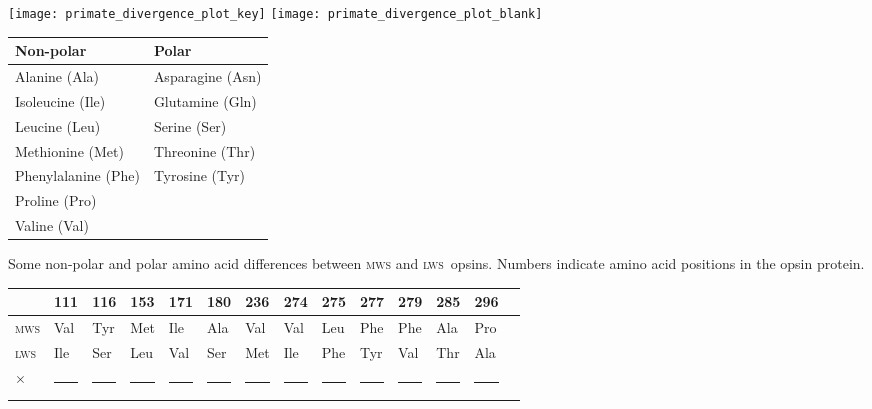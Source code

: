 \documentclass[12pt, addpoints]{exam}
\newcommand{\mws}{\textsc{mws}}
\newcommand{\lws}{\textsc{lws}}
\begin{document}
\begin{questions}
\bigskip

\parbox{\linewidth}{%
\ifprintanswers
\texttt{[image: primate\_divergence\_plot\_key]}
\else
\texttt{[image: primate\_divergence\_plot\_blank]}
\fi
{}\label{fig:divergence_plot}\par
}
\bigskip

\begin{threeparttable}[t]
\captionsetup{type=table, position=top,skip=0pt}
\label{tab:amino_acid_properties}
\begin{tabular}{@{}ll@{}}
\toprule
Non-polar 			& Polar \tabularnewline
\midrule
Alanine (Ala) 		& Asparagine (Asn)	\tabularnewline
Isoleucine (Ile)	& Glutamine	(Gln)	\tabularnewline
Leucine	(Leu)		& Serine (Ser)		\tabularnewline
Methionine (Met)	& Threonine (Thr)	\tabularnewline
Phenylalanine (Phe)	& Tyrosine (Tyr)	\tabularnewline
Proline	(Pro)		&					\tabularnewline
Valine (Val)		&					\tabularnewline
\bottomrule
\end{tabular}\par
\end{threeparttable}\par

\bigskip

\begin{threeparttable}
\caption{Some non-polar and polar amino acid differences between \mws{} and \lws{}~opsins. Numbers indicate amino acid positions in the opsin protein.}\label{tab:amino_acid_diffs}
\begin{tabular}{@{}*{14}{l}@{}}
\toprule
 & 111 & 116 & 153 & 171 & 180 & 236 & 274 & 275 & 277 & 279 & 285 & 296 \tabularnewline
\midrule
\textsc{mws} & Val & Tyr & Met & Ile & Ala & Val & Val & Leu & Phe & Phe & Ala & Pro \tabularnewline
\textsc{lws} & Ile & Ser & Leu & Val & Ser & Met & Ile & Phe & Tyr & Val & Thr & Ala \tabularnewline
\midrule\noalign{\medskip}
 {\Large $\times$} 	   & \rule{0.5cm}{0.4pt}
 & \rule{0.5cm}{0.4pt} & \rule{0.5cm}{0.4pt}
 & \rule{0.5cm}{0.4pt} & \ifprintanswers{\large $\times$}\else\rule{0.5cm}{0.4pt}\fi
 & \rule{0.5cm}{0.4pt} & \rule{0.5cm}{0.4pt} 
 & \rule{0.5cm}{0.4pt} & \ifprintanswers{\large $\times$}\else\rule{0.5cm}{0.4pt}\fi 
 & \rule{0.5cm}{0.4pt} & \ifprintanswers{\large $\times$}\else\rule{0.5cm}{0.4pt}\fi  
 & \rule{0.5cm}{0.4pt} \tabularnewline
\bottomrule
\end{tabular}
\end{threeparttable}


\end{questions}
\end{document}
